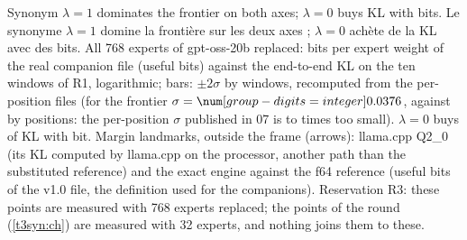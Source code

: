 {}
  {Synonym $\lambda=1$ dominates the frontier on both axes; $\lambda=0$ buys KL with bits.}
  {Le synonyme $\lambda=1$ domine la frontière sur les deux axes ; $\lambda=0$ achète de la KL avec des bits.}
  {All 768 experts of gpt-oss-20b replaced: bits per expert weight of the real companion file (useful bits)
   against the end-to-end KL on the ten windows of R1, logarithmic; bars: $\pm2\sigma$ by windows, recomputed from
   the per-position files (for the frontier $\sigma=\CodonNum{\SynoNVarFSf}$, against \CodonNum{\SynoNVarFSn} by
   positions: the per-position $\sigma$ published in 07 is \CodonNum{\SynoNSigmaRapportMin} to
   \CodonNum{\SynoNSigmaRapportMax} times too small). $\lambda=0$ buys \CodonNum{\SynoNAchatKL} of KL with
   \CodonNum{\SynoNAchatBits} bit. Margin landmarks, outside the frame (arrows): llama.cpp Q2\_0 (its KL computed
   by llama.cpp on the processor, another path than the substituted reference) and the exact engine against the
   f64 reference (useful bits of the v1.0 file, the definition used for the companions). Reservation R3: these
   points are measured with 768 experts replaced; the points of the round (\cref{t3syn:ch}) are measured with 32 experts,
   and nothing joins them to these.}
